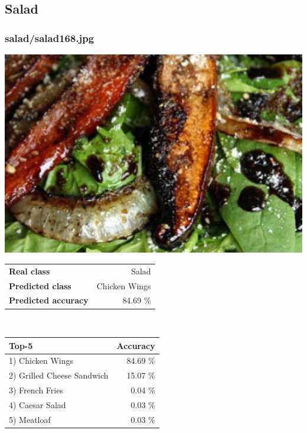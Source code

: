 \subsection{Salad}
    
\subsubsection{salad/salad168.jpg}

\begin{minipage}[t]{0.4\textwidth}
	\vspace{0pt}
	\includegraphics[width=\linewidth]{images/evaluation-images/salad/salad168.jpg}
\end{minipage}
\hfill
\begin{minipage}[t]{0.5\textwidth}
	\vspace{0pt}\raggedright
	\begin{tabularx}{\textwidth}{X r}
		\small \textbf{Real class} & \small Salad\\
		\small \textbf{Predicted class} & \small Chicken Wings\\
		\small \textbf{Predicted accuracy} & \small 84.69 \%
    \end{tabularx}\\
    
    \vspace{6pt}
	\begin{tabularx}{\textwidth}{X r}
        \small \textbf{Top-5} & \small \textbf{Accuracy} \\
        \hline
		\small 1) Chicken Wings & \small 84.69 \%\\\small 2) Grilled Cheese Sandwich & \small 15.07 \%\\\small 3) French Fries & \small 0.04 \%\\\small 4) Caesar Salad & \small 0.03 \%\\\small 5) Meatloaf & \small 0.03 \%
    \end{tabularx}
\end{minipage}
    
